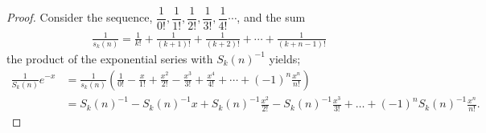 \documentclass[pdflatex,sn-mathphys-num]{sn-jnl}%
\theoremstyle{thmstyleone}%
\theoremstyle{thmstyletwo}%
\theoremstyle{thmstylethree}%
\begin{document}
\begin{proof}
Consider the sequence, $\dfrac{1}{0!},\dfrac{1}{1!} ,\dfrac{1}{2!} , \dfrac{1}{3!}, \dfrac{1}{4!}\cdots$, and the sum
\begin{align}\label{Sum}
\frac{1}{s_k(n)} = \frac{1}{k!} +  \frac{1}{(k + 1)!} +  \frac{1}{(k + 2)!} + \cdots +  \frac{1}{(k + n - 1)!}
\end{align}
the product of the exponential series with $S_k(n)^{-1}$ yields;
\begin{align*}
\frac{1}{S_k(n)}e^{-x} &=  \frac{1}{s_k(n)} \left(\frac{1}{0!} -  \frac{x}{1!} + \frac{x^2}{2!} - \frac{x^3}{3!} +\frac{x^4}{4!} + \cdots +(-1)^n\frac{x^n}{n!}\right)\\
&=S_k(n)^{-1} -S_k(n)^{-1}x + S_k(n)^{-1}\frac{x^2}{2!}- S_k(n)^{-1}\frac{x^3}{3!}+ \ldots + (-1)^nS_k(n)^{-1}\frac{x^n}{n!}.

\end{align*}
\end{proof}
\end{document}
